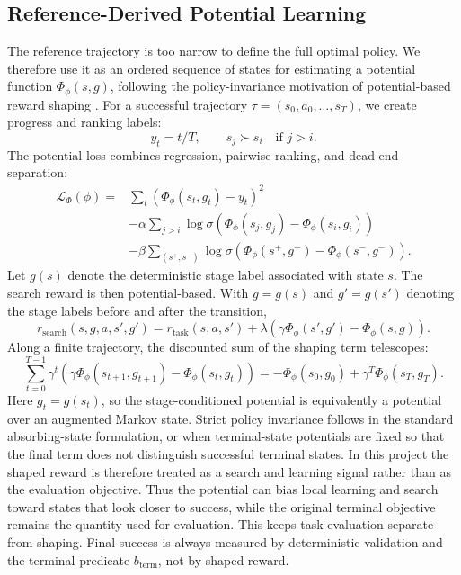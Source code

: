 \documentclass{article}
\begin{document}
\subsection{Reference-Derived Potential Learning}
\label{subsec:potential}
The reference trajectory is too narrow to define the full optimal policy.
We therefore use it as an ordered sequence of states for estimating a potential
function
\(\Phi_\phi(s,g)\), following the policy-invariance motivation of
potential-based reward shaping \citep{ng1999policy}.  For a successful trajectory
\(\tau=(s_0,a_0,\ldots,s_T)\), we create progress and ranking labels:
\[
  y_t = t/T,\qquad s_j \succ s_i \quad \text{if } j>i.
\]
The potential loss combines regression, pairwise ranking, and dead-end
separation:
\[
  \begin{aligned}
  \mathcal L_\Phi(\phi)
  ={}& \sum_t(\Phi_\phi(s_t,g_t)-y_t)^2 \\
  &-\alpha\sum_{j>i}
  \log\sigma(\Phi_\phi(s_j,g_j)-\Phi_\phi(s_i,g_i))\\
  &-\beta\sum_{(s^+,s^-)}
  \log\sigma(\Phi_\phi(s^+,g^+)-\Phi_\phi(s^-,g^-)).
  \end{aligned}
\]
Let \(g(s)\) denote the deterministic stage label associated with state \(s\).
The search reward is then potential-based.  With \(g=g(s)\) and \(g'=g(s')\)
denoting the stage labels before and after the transition,
\[
  r_{\mathrm{search}}(s,g,a,s',g') =
  r_{\mathrm{task}}(s,a,s')
  +\lambda\left(\gamma\Phi_\phi(s',g')-\Phi_\phi(s,g)\right).
\]
Along a finite trajectory, the discounted sum of the shaping term telescopes:
\[
  \sum_{t=0}^{T-1}\gamma^t
  \left(\gamma\Phi_\phi(s_{t+1},g_{t+1})-\Phi_\phi(s_t,g_t)\right)
  =
  -\Phi_\phi(s_0,g_0)+\gamma^T\Phi_\phi(s_T,g_T).
\]
Here \(g_t=g(s_t)\), so the stage-conditioned potential is equivalently a
potential over an augmented Markov state.  Strict policy invariance follows in
the standard absorbing-state formulation, or when terminal-state potentials are
fixed so that the final term does not distinguish successful terminal states.
In this project the shaped reward is therefore treated as a search and learning
signal rather than as the evaluation objective.
Thus the potential can bias local learning and search toward states that look
closer to success, while the original terminal objective remains the quantity
used for evaluation.
This keeps task evaluation separate from shaping.  Final success is always
measured by deterministic validation and the terminal predicate
\(b_{\mathrm{term}}\), not by shaped reward.
\end{document}
